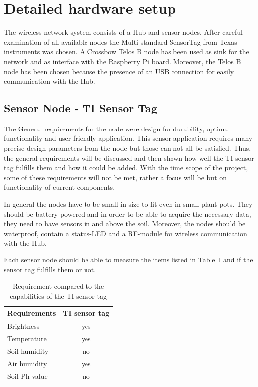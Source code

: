 \section{Detailed hardware setup}

The wireless network system consists of a Hub and sensor nodes. After careful examination of all available nodes the Multi-standard SensorTag from Texas instruments \cite{TIsensortag} was chosen. A Crossbow Telos B node has been used as sink for the network and as interface with the Raspberry Pi board. Moreover, the Telos B node has been chosen because  the presence of an USB connection for easily communication with the Hub.


\subsection{Sensor Node - TI Sensor Tag}

The General requirements for the node were design for durability, optimal functionality and user friendly application. This sensor application requires many precise design parameters from the node but those can not all be satisfied. Thus, the general requirements will be discussed and then shown how well the TI sensor tag fulfills them and how it could be added. With the time scope of the project, some of these requirements will not be met, rather a focus will be but on functionality of current components.

In general the nodes have to be small in size to fit even in small plant pots. They should be battery powered and in order to be able to acquire the necessary data, they need to have sensors in and above the soil. Moreover, the nodes should be waterproof, contain a status-LED and a RF-module for wireless communication with the Hub.

Each sensor node should be able to measure the items listed in Table \ref{list-req} and if the sensor tag fulfills them or not.
\begin{table}[htbp]
	\centering
	\begin{tabular}{lc}
		\toprule
		Requirements & \multicolumn{1}{l}{TI sensor tag} \\ 
		\midrule
		Brightness & yes \\ 
		Temperature & yes \\ 
		Soil humidity & no \\ 
		Air humidity & yes \\ 
		Soil Ph-value & no \\
		\bottomrule 
	\end{tabular}
	\vspace{0.1cm}
	\caption{Requirement compared to the capabilities of the TI sensor tag}
	\label{list-req}
\end{table}


